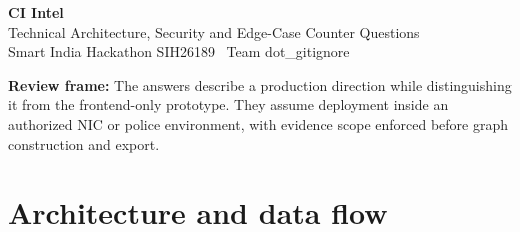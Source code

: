 \documentclass[10pt,a4paper]{article}
\newcommand{\note}[1]{\vspace{4pt}\noindent\colorbox{paper}{\parbox{\dimexpr\linewidth-2\fboxsep}{\small\textbf{Review frame:} #1}}\vspace{6pt}}
\begin{document}
\begin{center}
{\Huge\bfseries\color{navy}CI Intel}\\[3pt]
{\Large Technical Architecture, Security and Edge-Case Counter Questions}\\[5pt]
{\normalsize Smart India Hackathon SIH26189 \textbar\ Team dot\_gitignore}
\end{center}
\note{The answers describe a production direction while distinguishing it from the frontend-only prototype. They assume deployment inside an authorized NIC or police environment, with evidence scope enforced before graph construction and export.}

\section{Architecture and data flow}
\end{document}
